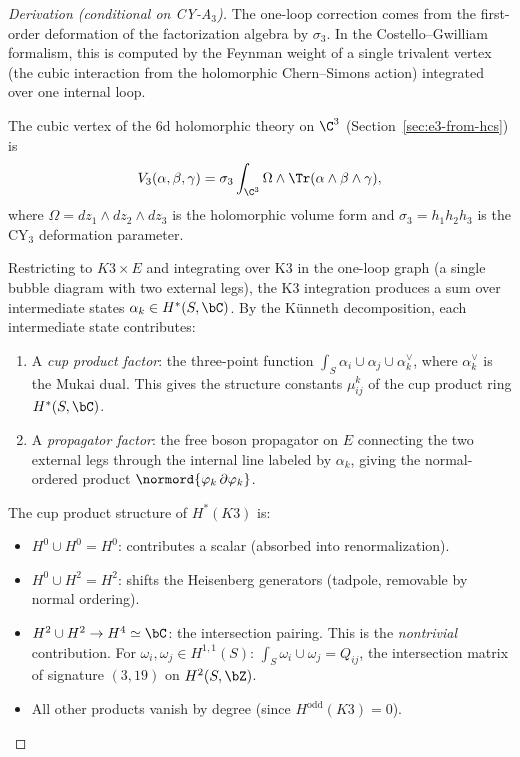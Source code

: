 \begin{proof}[Derivation (conditional on CY-A$_3$)]
The one-loop correction comes from the first-order deformation of
the factorization algebra by $\sigma_3$. In the
Costello--Gwilliam formalism, this is computed by the Feynman
weight of a single trivalent vertex (the cubic interaction from
the holomorphic Chern--Simons action) integrated over one internal
loop.

The cubic vertex of the 6d holomorphic theory on
$\C^3$ (Section~\ref{sec:e3-from-hcs}) is
\[
  V_3(\alpha, \beta, \gamma)
  = \sigma_3 \int_{\C^3} \Omega \wedge
  \Tr(\alpha \wedge \beta \wedge \gamma),
\]
where $\Omega = dz_1 \wedge dz_2 \wedge dz_3$ is the holomorphic
volume form and $\sigma_3 = h_1 h_2 h_3$ is the CY$_3$
deformation parameter.

Restricting to $K3 \times E$ and integrating over K3 in the one-loop
graph (a single bubble diagram with two external legs), the K3
integration produces a sum over intermediate states
$\alpha_k \in H^*(S, \bC)$. By the K\"unneth decomposition, each
intermediate state contributes:
\begin{enumerate}[label=(\roman*)]
\item A \emph{cup product factor}: the three-point function
$\int_S \alpha_i \cup \alpha_j \cup \alpha_k^{\vee}$, where
$\alpha_k^\vee$ is the Mukai dual. This gives the
structure constants $\mu^k_{ij}$ of the cup product ring
$H^*(S, \bC)$.
\item A \emph{propagator factor}: the free boson propagator
on $E$ connecting the two external legs through the
internal line labeled by $\alpha_k$, giving the normal-ordered
product $\normord{\varphi_k \,\partial\varphi_k}$.
\end{enumerate}

The cup product structure of $H^*(K3)$ is:
\begin{itemize}
\item $H^0 \cup H^0 = H^0$: contributes a scalar (absorbed into
 renormalization).
\item $H^0 \cup H^2 = H^2$: shifts the Heisenberg generators
 (tadpole, removable by normal ordering).
\item $H^2 \cup H^2 \to H^4 \simeq \bC$: the intersection pairing.
 This is the \emph{nontrivial} contribution. For
 $\omega_i, \omega_j \in H^{1,1}(S)$:
 $\int_S \omega_i \cup \omega_j = Q_{ij}$, the intersection
 matrix of signature $(3, 19)$ on $H^2(S, \bZ)$.
\item All other products vanish by degree (since
 $H^{\mathrm{odd}}(K3) = 0$).
\end{itemize}


\end{proof}
